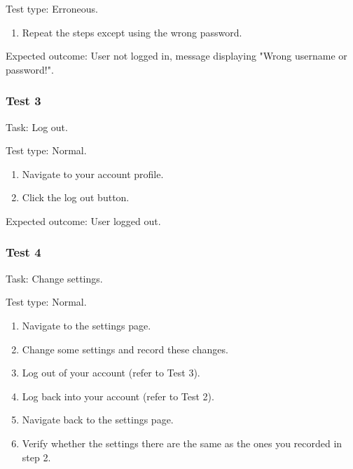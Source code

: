 {\color{gray} \hrulefill}

{\sffamily Test type: Erroneous.}\\

\begin{enumerate}
  \item Repeat the steps except using the wrong password.
\end{enumerate}

{\sffamily Expected outcome:} User not logged in,
message displaying "Wrong username or password!". \\ 

{\color{gray} \hrulefill}

\vspace{0.2cm}

\subsubsection{Test 3}

{\sffamily Task:} Log out.\\ 

{\color{gray} \hrulefill}

{\sffamily Test type: Normal.}\\

\begin{enumerate}
  \item Navigate to your account profile.
  \item Click the log out button.
\end{enumerate}

{\sffamily Expected outcome:} User logged out. \\ 

{\color{gray} \hrulefill}

\vspace{0.2cm}

\subsubsection{Test 4}

{\sffamily Task:} Change settings.\\ 

{\color{gray} \hrulefill}

{\sffamily Test type: Normal.}\\

\begin{enumerate}
  \item Navigate to the settings page.
  \item Change some settings and record these changes.
  \item Log out of your account (refer to Test 3). 
  \item Log back into your account (refer to Test 2).
  \item Navigate back to the settings page.
  \item Verify whether the settings there are the same as the ones you recorded in step 2.
\end{enumerate}

